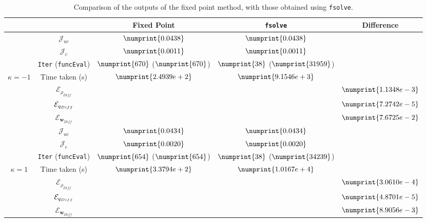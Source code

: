 \begin{table}
\begin{tabular}{ | c | c || c | c | c ||}
\hline
\multicolumn{2}{|c||}{} & Fixed Point & \texttt{fsolve} & Difference   \\
\hline
\hline
 & $\mathcal{J}_{uc}$ & $\numprint{0.0438}$ & $\numprint{0.0438}$ &   \\
 & $\mathcal{J}_{c}$ & $\numprint{0.0011}$ & $\numprint{0.0011}$ &   \\
 & \texttt{Iter} (\texttt{funcEval}) & $\numprint{670}$ ($\numprint{670}$)  & $\numprint{38}$ ($\numprint{31959}$)  &   \\
$\kappa =-1$ & Time taken (s) & $\numprint{2.4939e+2}$ & $\numprint{9.1546e+3}$ &   \\
 & $\mathcal{E}_{\rho_{Diff}}$ & & &$\numprint{1.1348e-3}$  \\
 & $\mathcal{E}_{q_{Diff}}$ & & &$\numprint{7.2742e-5}$  \\
 & $\mathcal{E}_{\mathbf{w}_{Diff}}$ & & & $\numprint{7.6725e-2}$  \\
\hline
 & $\mathcal{J}_{uc}$ & $\numprint{0.0434}$ & $\numprint{0.0434}$ &   \\
 & $\mathcal{J}_{c}$ & $\numprint{0.0020}$ & $\numprint{0.0020}$ &   \\
 & \texttt{Iter} (\texttt{funcEval}) & $\numprint{654}$ ($\numprint{654}$)  & $\numprint{38}$ ($\numprint{34239}$)  &   \\
$\kappa =1$ & Time taken (s) & $\numprint{3.3794e+2}$ & $\numprint{1.0167e+4}$ &   \\
 & $\mathcal{E}_{\rho_{Diff}}$ & & &$\numprint{3.0610e-4}$  \\
 & $\mathcal{E}_{q_{Diff}}$ & & &$\numprint{4.8701e-5}$  \\
 & $\mathcal{E}_{\mathbf{w}_{Diff}}$ & & & $\numprint{8.9056e-3}$  \\
\hline
\end{tabular}
\caption{Comparison of the outputs of the fixed point method, with those obtained using \texttt{fsolve}.}
\label{TabA3:Prob1}
\end{table}